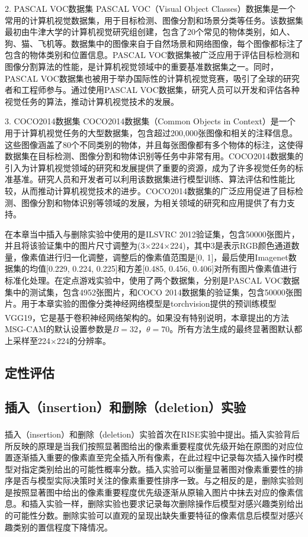 2. PASCAL VOC数据集
PASCAL VOC（Visual Object Classes）数据集是一个常用的计算机视觉数据集，用于目标检测、图像分割和场景分类等任务。该数据集最初由牛津大学的计算机视觉研究组创建，包含了20个常见的物体类别，如人、狗、猫、飞机等。数据集中的图像来自于自然场景和网络图像，每个图像都标注了包含的物体类别和位置信息。PASCAL VOC数据集被广泛应用于评估目标检测和图像分割算法的性能，是计算机视觉领域中的重要基准数据集之一。同时，PASCAL VOC数据集也被用于举办国际性的计算机视觉竞赛，吸引了全球的研究者和工程师参与。通过使用PASCAL VOC数据集，研究人员可以开发和评估各种视觉任务的算法，推动计算机视觉技术的发展。

3. COCO2014数据集
COCO2014数据集（Common Objects in Context）是一个用于计算机视觉任务的大型数据集，包含超过200,000张图像和相关的注释信息。这些图像涵盖了80个不同类别的物体，并且每张图像都有多个物体的标注，这使得数据集在目标检测、图像分割和物体识别等任务中非常有用。COCO2014数据集的引入为计算机视觉领域的研究和发展提供了重要的资源，成为了许多视觉任务的标准基准。研究人员和开发者可以利用该数据集进行模型训练、算法评估和性能比较，从而推动计算机视觉技术的进步。COCO2014数据集的广泛应用促进了目标检测、图像分割和物体识别等领域的发展，为相关领域的研究和应用提供了有力支持。

在本章当中插入与删除实验中使用的是ILSVRC 2012验证集，包含50000张图片，并且将该验证集中的图片尺寸调整为(3$\times$224$\times$224)，其中$3$是表示RGB颜色通道数量，像素值进行归一化调整，调整后的像素值范围是[0, 1]，最后使用Imagenet数据集的均值[0.229, 0.224, 0.225]和方差[0.485, 0.456, 0.406]对所有图片像素值进行标准化处理。在定点游戏实验中，使用了两个数据集，分别是PASCAL VOC数据集中的测试集，包含4952张图片，和COCO 2014数据集的验证集，包含50000张图片。用于本章实验的图像分类神经网络模型是torchvision提供的预训练模型VGG19\textsuperscript{\cite{simonyan2014very}}，它是基于卷积神经网络架构的。如果没有特别说明，本章提出的方法MSG-CAM的默认设置参数是$B=32$，$\theta=70$。所有方法生成的最终显著图默认都上采样至224$\times$224的分辨率。
\subsection{定性评估}

\subsection{插入（insertion）和删除（deletion）实验}
插入（insertion）和删除（deletion）实验首次在RISE\textsuperscript{\cite{petsiuk2018rise}}实验中提出。插入实验背后所反映的原理是当我们按照显著图给出的像素重要程度优先级开始在原图的对应位置逐渐插入重要的像素直至完全插入所有像素，在此过程中记录每次插入操作时模型对指定类别给出的可能性概率分数。插入实验可以衡量显著图对像素重要性的排序是否与模型实际决策时关注的像素重要性排序一致。与之相反的是，删除实验则是按照显著图中给出的像素重要程度优先级逐渐从原输入图片中抹去对应的像素信息。和插入实验一样，删除实验也要求记录每次删除操作后模型对感兴趣类别给出的可能性分数。删除实验可以直观的呈现出缺失重要特征的像素信息后模型对感兴趣类别的置信程度下降情况。

